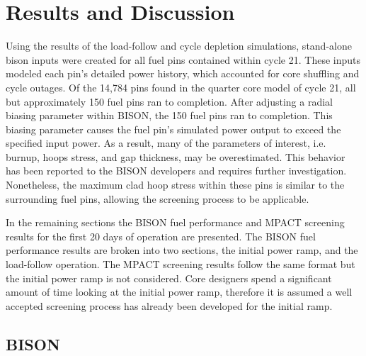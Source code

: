 \documentclass[edeposit,fullpage,11pt]{uiucthesis2009}
\begin{document}



\chapter{Results and Discussion}
Using the results of the load-follow and  cycle depletion simulations, stand-alone bison inputs were created for all fuel pins contained within cycle 21. 
These inputs modeled each pin's detailed power history, which accounted for core shuffling and cycle outages. 
Of the 14,784 pins found in the quarter core model of cycle 21, all but approximately 150 fuel pins ran to completion.
After adjusting a radial biasing parameter within BISON, the 150 fuel pins ran to completion.
This biasing parameter causes the fuel pin's simulated power output to exceed the specified input power.
As a result, many of the parameters of interest, i.e. burnup, hoops stress, and gap thickness, may be overestimated.
This behavior has been reported to the BISON developers and requires further investigation. 
Nonetheless, the maximum clad hoop stress within these pins is similar to the surrounding fuel pins, allowing the screening process to be applicable.

In the remaining sections the BISON fuel performance and MPACT screening results for the first 20 days of operation are presented.
The BISON fuel performance results are broken into two sections, the initial power ramp, and the load-follow operation.
The MPACT screening results follow the same format but the initial power ramp is not considered. 
Core designers spend a significant amount of time looking at the initial power ramp, therefore it is assumed a well accepted screening process has already been developed for the initial ramp.

\section{BISON}
\end{document}
